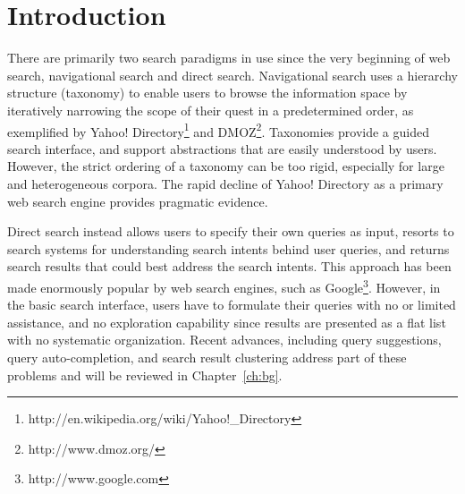 \chapter{Introduction}
\label{ch:intro}


There are primarily two search paradigms in use since the very beginning of web search, navigational search and direct search. Navigational search uses a hierarchy structure (taxonomy) to enable users to browse the information space by iteratively narrowing the scope of their quest in a predetermined order, as exemplified by Yahoo! Directory\footnote{http://en.wikipedia.org/wiki/Yahoo!\_Directory} and DMOZ\footnote{http://www.dmoz.org/}. Taxonomies provide a guided search interface, and support abstractions that are easily understood by users. However, the strict ordering of a taxonomy can be too rigid, especially for large and heterogeneous corpora. The rapid decline of Yahoo! Directory as a primary web search engine provides pragmatic evidence.

Direct search instead allows users to specify their own queries as input, resorts to search systems for understanding search intents behind user queries, and returns search results that could best address the search intents. This approach has been made enormously popular by web search engines, such as Google\footnote{http://www.google.com}. However, in the basic search interface, users have to formulate their queries with no or limited assistance, and no exploration capability since results are presented as a flat list with no systematic organization. Recent advances, including query suggestions, query auto-completion, and search result clustering address part of these problems and will be reviewed in Chapter~\ref{ch:bg}.

